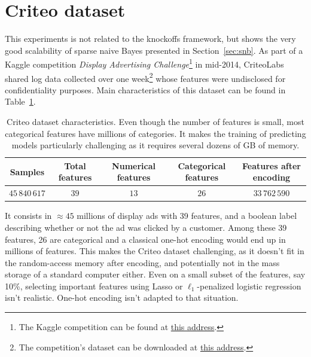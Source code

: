 \section{Criteo dataset}\label{sec:snb_criteo}

This experiments is not related to the knockoffs framework,
but shows the very good scalability of sparse naive Bayes presented in Section~\ref{sec:snb}.
As part of a Kaggle competition \emph{Display Advertising Challenge}\footnote{
    The Kaggle competition can be found at
    \href{https://www.kaggle.com/c/criteo-display-ad-challenge}{this address}.
}
in mid-2014, CriteoLabs shared log data collected over one week\footnote{
    The competition's dataset can be downloaded at
    \href{https://labs.criteo.com/2014/02/download-kaggle-display-advertising-challenge-dataset/}{this address}.
}
whose features were undisclosed for confidentiality purposes.
Main characteristics of this dataset can be found in Table~\ref{tab:criteo_dataset}.
\begin{table}[!htb]
    \centering
    \setlength{\tabcolsep}{2pt}
    {\small
        \begin{tabular}{|c|c|c|c|c|}\hline
        \textbf{Samples} & \textbf{Total features} & \textbf{Numerical features} & \textbf{Categorical features} & \textbf{Features after encoding}\\ \hline
        $45\,840\,617$ & $39$  & $13$ & $26$ & $33\,762\,590$ \\ \hline
        \end{tabular}
    }%
    \caption[short]{
        Criteo dataset characteristics.
        Even though the number of features is small,
        most categorical features have millions of categories.
        It makes the training of predicting models particularly challenging as it requires several
        dozens of GB of memory.
    }
    \label{tab:criteo_dataset}
\end{table}
It consists in $\approx 45$ millions of display ads with 39 features,
and a boolean label describing whether or not the ad was clicked by a customer.
Among these 39 features, 26 are categorical and a classical one-hot encoding would end up in millions of features.
This makes the Criteo dataset challenging, as it doesn't fit in the random-access memory after encoding,
and potentially not in the mass storage of a standard computer either.
Even on a small subset of the features, say 10\%,
selecting important features using Lasso or $\ell_1$-penalized logistic regression isn't realistic.
One-hot encoding isn't adapted to that situation.
